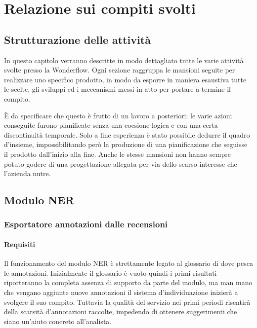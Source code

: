
\chapter{Relazione sui compiti svolti}
\label{cap:relazione}

\section{Strutturazione delle attività}
In questo capitolo verranno descritte in modo dettagliato tutte le varie
attività svolte presso la Wonderflow. Ogni sezione raggruppa le mansioni seguite
per realizzare uno specifico prodotto, in modo da esporre in maniera esaustiva
tutte le scelte, gli sviluppi ed i meccanismi messi in atto per portare a
termine il compito.

È da specificare che questo è frutto di un lavoro a posteriori: le varie azioni
conseguite furono pianificate senza una coesione logica e con una certa
discontinuità temporale. Solo a fine esperienza è stato possibile dedurre il
quadro d'insieme, impossibilitando però la produzione di una pianificazione che
seguisse il prodotto dall'inizio alla fine. Anche le stesse mansioni non hanno
sempre potuto godere di una progettazione allegata per via dello scarso
interesse che l'azienda nutre.

\section{Modulo NER}
\subsection{Esportatore annotazioni dalle recensioni}
\subsubsection{Requisiti}
Il funzionamento del modulo NER è strettamente legato al glossario di dove
pesca le annotazioni. Inizialmente il glossario è vuoto quindi i primi risultati
riporteranno la completa assenza di supporto da parte del modulo, ma man mano
che vengano aggiunte nuove annotazioni il sistema d'individuazione inizierà a
svolgere il suo compito. Tuttavia la qualità del servizio nei primi periodi
risentirà della scarsità d'annotazioni raccolte, impedendo di ottenere
suggerimenti che siano un'aiuto concreto all'analista.

